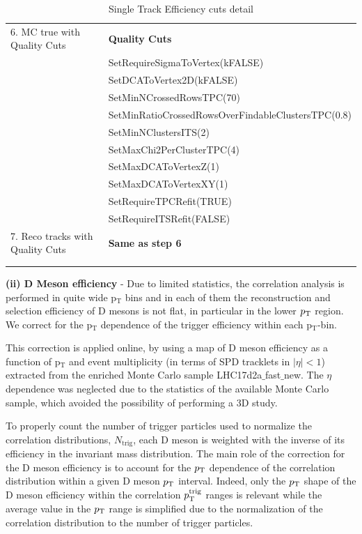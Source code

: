 \begin{table}[h]
\begin{tabular}{  p{5cm} |  p{8.5cm} }
6. MC true with Quality Cuts         &      			      {\textbf  {Quality Cuts }} \\
																	&SetRequireSigmaToVertex(kFALSE) \\
																	&SetDCAToVertex2D(kFALSE) \\
																	&SetMinNCrossedRowsTPC(70)\\
																	&SetMinRatioCrossedRowsOverFindableClustersTPC(0.8)\\
																	&SetMinNClustersITS(2)\\
																	&SetMaxChi2PerClusterTPC(4)\\
																	&SetMaxDCAToVertexZ(1) \\
																	&SetMaxDCAToVertexXY(1) \\
																	&SetRequireTPCRefit(TRUE) \\
																	&SetRequireITSRefit(FALSE) \\

7. Reco tracks with Quality Cuts         &             {\textbf  {Same as step 6}} \\

 &\\		            	            		

 \hline \hline
 \\
\end{tabular}
\caption{\large {Single Track Efficiency cuts detail}} %
\label{table:effCuts}	
\end{table}

{\bf \large (ii) D Meson efficiency} - Due to limited statistics, the correlation analysis is performed in quite wide p$_\mathrm{T}$ bins and in each of them the reconstruction and selection efficiency of D mesons is not flat, in particular in the lower $p_{\rm T}$ region. We correct for the p$_\mathrm{T}$ dependence of the trigger efficiency within each p$_\mathrm{T}$-bin.

This correction is applied online, by using a map of D meson efficiency as a function of p$_\mathrm{T}$ and event multiplicity (in terms of SPD tracklets in $|\eta|<1$) extracted from the enriched Monte Carlo sample LHC17d2a$\_$fast$\_$new. The $\eta$ dependence was neglected due to the statistics of the available Monte Carlo sample, which avoided the possibility of performing a 3D study.

To properly count the number of trigger particles used to normalize the correlation distributions, $N_\text{trig}$, each D meson is weighted with the inverse of its efficiency
in the invariant mass distribution. The main role of the correction for the D meson efficiency is to account for the $p_{\rm T}$ dependence of the correlation distribution within a given D meson $p_{\rm T}$ interval. Indeed, only the $p_{\rm T}$ shape of the D meson efficiency within the correlation $p_{\rm T}^{\rm trig}$ ranges is relevant while the average value
in the $p_{\rm T}$ range is simplified due to the normalization of the correlation distribution to the number of trigger particles.

